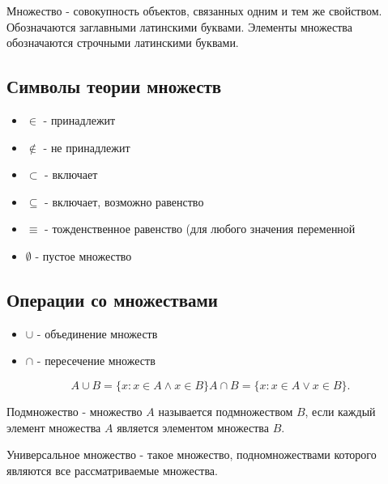 \begin{definition}
  Множество - совокупность объектов, связанных одним и тем же свойством. Обозначаются заглавными латинскими буквами. Элементы множества обозначаются строчными латинскими буквами.
\end{definition}

\subsection{Символы теории множеств}

\begin{itemize}
  \item $\in$ - принадлежит\\
  \item $\notin$ - не принадлежит\\
  \item $\subset$ - включает\\
  \item $\subseteq$ - включает, возможно равенство\\
  \item $\equiv$ - тожденственное равенство (для любого значения переменной\\
  \item $\emptyset$ - пустое множество
\end{itemize}

\subsection{Операции со множествами}

\begin{itemize}
  \item $\cup$ - объединение множеств
  \item $\cap$ - пересечение множеств
\end{itemize}

\begin{note}
   \[
  A\cup B = \{ x : x\in A \land x\in B\} 
  A\cap B = \{x : x\in A \lor x\in B\} 
  .\] 
\end{note}

\begin{definition}
  Подмножество - множество $A$ называется подмножеством  $B$, если каждый элемент множества $A$ является элементом множества $B$.
\end{definition}

\begin{definition}
  Универсальное множество - такое множество, подномножествами которого являются все рассматриваемые множества.
\end{definition}

